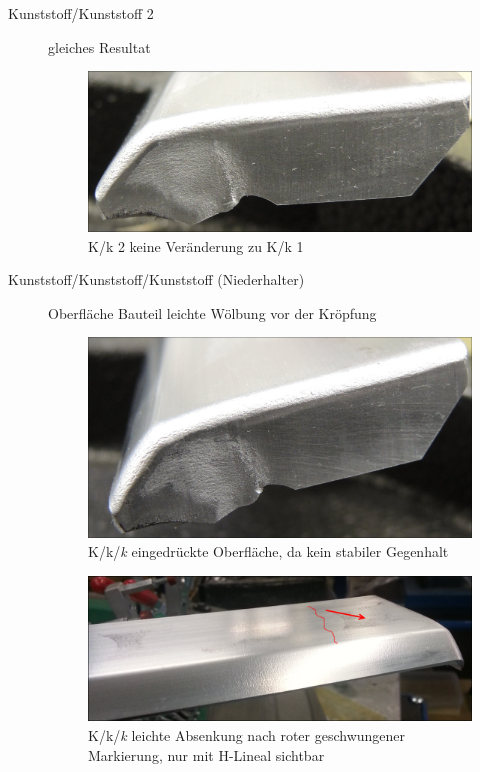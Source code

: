 \documentclass[12pt,a4paper,parskip,twoside,BCOR5mm,headsepline]{scrartcl}
\begin{document}
\begin{description*}
\begin{description}
\item[Kunststoff/Kunststoff 2] gleiches Resultat
\begin{figure}[H]
\centering
\includegraphics[width=.8\textwidth]{Kk2}
\caption{K/k 2 keine Veränderung zu K/k 1}
\label{fig:Kb1a}
\end{figure}
\newpage

\item[Kunststoff/Kunststoff/Kunststoff (Niederhalter)] Oberfläche Bauteil leichte Wölbung vor der Kröpfung
\begin{figure}[H]
\centering
\includegraphics[width=.8\textwidth]{Kkk1}
\caption{K/k/\emph{k} eingedrückte Oberfläche, da kein stabiler Gegenhalt}
\label{fig:Kkk1}
\end{figure}
\begin{figure}[H]
\centering
\includegraphics[width=.8\textwidth]{BauteilAbsenkSk3}
\caption{K/k/\emph{k} leichte Absenkung nach roter geschwungener Markierung, nur mit H-Lineal sichtbar}
\label{fig:sKs3}
\end{figure}
\newpage


\end{description}
\end{description*}
\end{document}
